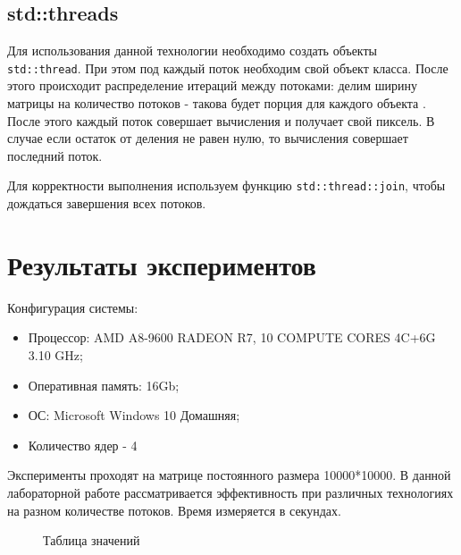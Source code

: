 \documentclass[14pt, a4paper]{extreport}
\begin{document}
\subsection*{std::threads}

Для использования данной технологии необходимо создать объекты\\
\verb|std::thread|. При этом под каждый поток необходим свой объект класса. После этого происходит распределение итераций между потоками: делим ширину матрицы на количество потоков - такова будет порция для каждого объекта . После этого каждый поток совершает вычисления и получает свой пиксель. В случае если остаток от деления не равен нулю, то вычисления совершает последний поток.

Для корректности выполнения используем функцию \verb|std::thread::join|, чтобы дождаться завершения всех потоков.
\newpage

\section*{Результаты экспериментов}

Конфигурация системы:
\begin{itemize}
\item Процессор: AMD A8-9600 RADEON R7, 10 COMPUTE CORES 4C+6G 3.10 GHz;
\item Оперативная память: 16Gb;
\item ОС: Microsoft Windows 10 Домашняя;
\item Количество ядер - 4
\end{itemize}

Эксперименты проходят на матрице постоянного размера 10000*10000. В данной лабораторной работе рассматривается эффективность при различных технологиях на разном количестве потоков. Время измеряется в секундах.

\begin{figure}[h]
\caption{Таблица значений}
\label{fig:image}
\end{figure}
\end{document}
